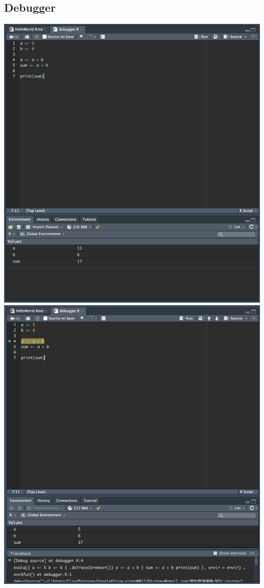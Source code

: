 \documentclass[11pt]{article}
\begin{document}
    \subsection{Debugger}
        \includegraphics[scale = 0.4]{Q1_3_1_debugger.png} 
        \newline
        \includegraphics[scale = 0.4]{Q1_3_2_debugger.png}
\end{document}
